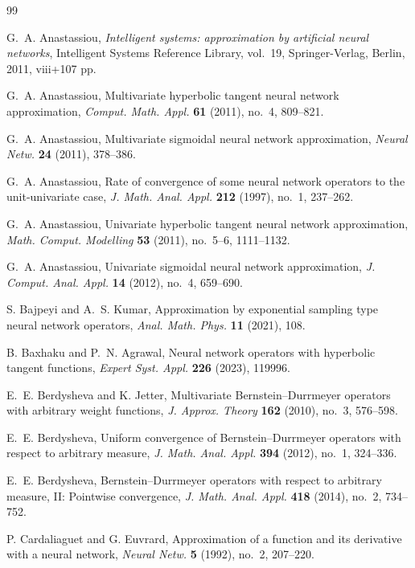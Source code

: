 \documentclass[12pt, reqno]{amsart}
\numberwithin{equation}{section}
\theoremstyle{definition}
\theoremstyle{remark}
\numberwithin{equation}{section}
\begin{document}
\begin{thebibliography}{99}

 G.~A. Anastassiou, \textit{Intelligent systems: approximation by artificial neural networks}, Intelligent Systems Reference Library, vol.~19, Springer-Verlag, Berlin, 2011, viii+107 pp.

 G.~A. Anastassiou, Multivariate hyperbolic tangent neural network approximation, \textit{Comput. Math. Appl.} \textbf{61} (2011), no.~4, 809--821.

 G.~A. Anastassiou, Multivariate sigmoidal neural network approximation, \textit{Neural Netw.} \textbf{24} (2011), 378--386.

 G.~A. Anastassiou, Rate of convergence of some neural network operators to the unit-univariate case, \textit{J. Math. Anal. Appl.} \textbf{212} (1997), no.~1, 237--262.

 G.~A. Anastassiou, Univariate hyperbolic tangent neural network approximation, \textit{Math. Comput. Modelling} \textbf{53} (2011), no.~5--6, 1111--1132.

 G.~A. Anastassiou, Univariate sigmoidal neural network approximation, \textit{J. Comput. Anal. Appl.} \textbf{14} (2012), no.~4, 659--690.

 S. Bajpeyi and A.~S. Kumar, Approximation by exponential sampling type neural network operators, \textit{Anal. Math. Phys.} \textbf{11} (2021), 108.

 B. Baxhaku and P.~N. Agrawal, Neural network operators with hyperbolic tangent functions, \textit{Expert Syst. Appl.} \textbf{226} (2023), 119996.

 E.~E. Berdysheva and K. Jetter, Multivariate Bernstein--Durrmeyer operators with arbitrary weight functions, \textit{J. Approx. Theory} \textbf{162} (2010), no.~3, 576--598.

 E.~E. Berdysheva, Uniform convergence of Bernstein--Durrmeyer operators with respect to arbitrary measure, \textit{J. Math. Anal. Appl.} \textbf{394} (2012), no.~1, 324--336.

 E.~E. Berdysheva, Bernstein--Durrmeyer operators with respect to arbitrary measure, II: Pointwise convergence, \textit{J. Math. Anal. Appl.} \textbf{418} (2014), no.~2, 734--752.

 P. Cardaliaguet and G. Euvrard, Approximation of a function and its derivative with a neural network, \textit{Neural Netw.} \textbf{5} (1992), no.~2, 207--220.


\end{thebibliography}
\end{document}

